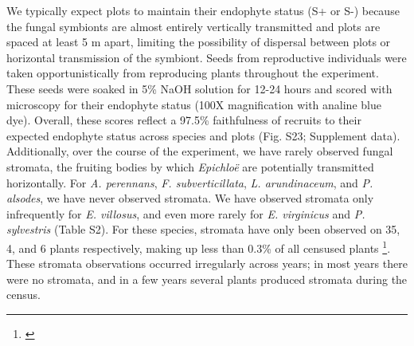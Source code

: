 \documentclass[12pt]{article}
\newcommand{\tom}[2]{{\color{red}{#1}}\footnote{\textit{\color{red}{#2}}}}
\begin{document}
We typically expect plots to maintain their endophyte status (S+ or S-) because the fungal symbionts are almost entirely vertically transmitted and plots are {\color{red}spaced at least 5 m apart}, limiting the possibility of dispersal between plots or horizontal transmission of the symbiont. 
Seeds from reproductive individuals were taken opportunistically from reproducing plants throughout the experiment. 
These seeds were soaked in 5\% NaOH solution for 12-24 hours and scored with microscopy for their endophyte status  (100X magnification with analine blue dye).  
Overall, these scores reflect a 97.5\% faithfulness of recruits to their expected endophyte status across species and plots (Fig. S23; Supplement data). 
Additionally, over the course of the experiment, we have rarely observed fungal stromata, the fruiting bodies by which \emph{Epichlo\"e} are potentially transmitted horizontally. 
For \emph{A. perennans}, \emph{F. subverticillata}, \emph{L. arundinaceum}, and \emph{P. alsodes}, we have never observed stromata. 
We have observed stromata only infrequently for \emph{E. villosus}, and even more rarely for \emph{E. virginicus} and \emph{P. sylvestris} (Table S2). 
For these species, stromata have only been observed on 35, 4, and 6 plants respectively, making up less than 0.3\% of all censused plants \tom{(Supplemental data)}{I would put these frequencies in the table rather than just yes/no.}.
These stromata observations occurred irregularly across years; in most years there were no stromata, and in a few years several plants produced stromata during the census. 
\end{document}
